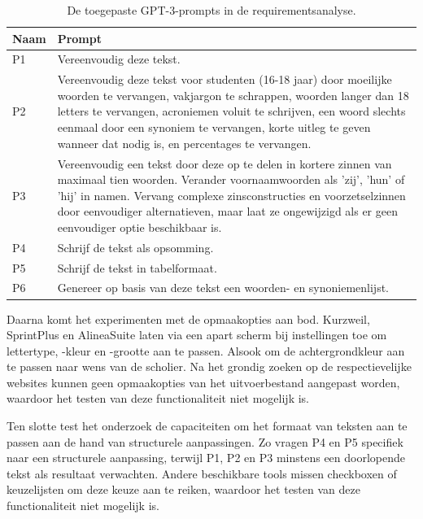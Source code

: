 \begin{center}
	\begin{table}[H]
		\begin{tabular}{ | m{2cm} | m{14cm} | } 
			\hline
			\textbf{Naam} & \textbf{Prompt} \\
			\hline
			P1 & Vereenvoudig deze tekst. \\
			\hline
			P2 & Vereenvoudig deze tekst voor studenten (16-18 jaar) door moeilijke woorden te vervangen, vakjargon te schrappen, woorden langer dan 18 letters te vervangen, acroniemen voluit te schrijven, een woord slechts eenmaal door een synoniem te vervangen, korte uitleg te geven wanneer dat nodig is, en percentages te vervangen. \\
			\hline
			P3 & Vereenvoudig een tekst door deze op te delen in kortere zinnen van maximaal tien woorden. Verander voornaamwoorden als 'zij', 'hun' of 'hij' in namen. Vervang complexe zinsconstructies en voorzetselzinnen door eenvoudiger alternatieven, maar laat ze ongewijzigd als er geen eenvoudiger optie beschikbaar is. \\
			\hline
			P4 & Schrijf de tekst als opsomming. \\
			\hline
			P5 & Schrijf de tekst in tabelformaat. \\
			\hline
			P6 & Genereer op basis van deze tekst een woorden- en synoniemenlijst. \\
			\hline
		\end{tabular}
		\caption{De toegepaste GPT-3-prompts in de requirementsanalyse.}
		\label{table:tested-prompts-requirementsanalysis}
	\end{table}
\end{center}

\medspace

Daarna komt het experimenten met de opmaakopties aan bod. Kurzweil, SprintPlus en AlineaSuite laten via een apart scherm bij instellingen toe om lettertype, -kleur en -grootte aan te passen. Alsook om de achtergrondkleur aan te passen naar wens van de scholier. Na het grondig zoeken op de respectievelijke websites kunnen geen opmaakopties van het uitvoerbestand aangepast worden, waardoor het testen van deze functionaliteit niet mogelijk is.

\medspace

Ten slotte test het onderzoek de capaciteiten om het formaat van teksten aan te passen aan de hand van structurele aanpassingen. Zo vragen P4 en P5 specifiek naar een structurele aanpassing, terwijl P1, P2 en P3 minstens een doorlopende tekst als resultaat verwachten. Andere beschikbare tools missen checkboxen of keuzelijsten om deze keuze aan te reiken, waardoor het testen van deze functionaliteit niet mogelijk is.

